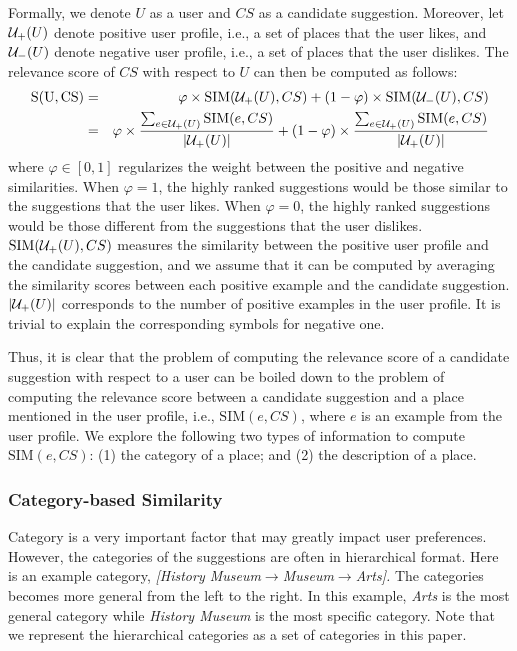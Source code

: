 Formally, we denote $U$ as a user and $CS$ as a candidate suggestion. 
Moreover, let ${\cal U}_{+}(U)$ denote positive user profile, 
i.e., a set of places that the user likes, 
and ${\cal U}_{-}(U)$ denote negative user profile, i.e., a set 
of places that the user dislikes. The relevance score of $CS$ with 
respect to $U$ can then be computed as follows:  
\begin{eqnarray}
    \mathrm{S(U,CS)} &=& \varphi \times \mathrm{SIM}({\cal U}_{+}(U),CS) + (1-\varphi) \times \mathrm{SIM}({\cal U}_{-}(U),CS) \\
&=& \varphi \times \frac{\sum_{e \in {\cal U}_{+}(U)}{\mathrm{SIM}(e,CS)}}{|{\cal U}_{+}(U)|} 
+ (1-\varphi) \times \frac{\sum_{e \in {\cal U}_{+}(U)}{\mathrm{SIM}(e,CS)}}{|{\cal U}_{+}(U)|} 
\label{chap5_eq1}
\end{eqnarray}
where $\varphi \in [0,1]$ regularizes the weight between the 
positive and negative similarities. When $\varphi=1$, the highly ranked 
suggestions would be those similar to the suggestions that the user likes. 
When $\varphi=0$, the highly ranked suggestions would be those 
different from the suggestions that the user dislikes. 
$\mathrm{SIM}({\cal U}_{+}(U),CS)$ measures the similarity between the 
positive user profile and the candidate suggestion, 
and we assume that it can be computed 
by averaging the similarity scores between each positive example and 
the candidate suggestion. $|{\cal U}_{+}(U)|$ corresponds to the number of 
positive examples in the user profile. It is trivial to explain the 
corresponding symbols for negative one.

Thus, it is clear that the problem of computing the relevance score 
of a candidate suggestion with respect to a user can be boiled down 
to the problem of computing the relevance score between a candidate
suggestion and a place mentioned in the user profile, i.e., $\mathrm{SIM}(e,CS)$, 
where $e$ is an example from the user profile. We explore the following 
two types of information to compute $\mathrm{SIM}(e,CS)$: (1) the category 
of a place; and (2) the description of a place. 


\subsubsection{Category-based Similarity}
Category is a very important factor that may greatly impact user preferences. 
However, the categories of the suggestions are often in hierarchical format. 
Here is an example category, 
\textit{[History Museum$\to$Museum$\to$Arts].}
The categories becomes more general from the left to the right. 
In this example, \textit{Arts} is the most general category
while \textit{History Museum} is the most specific category.
Note that we represent the hierarchical categories
as a set of categories in this paper. 


